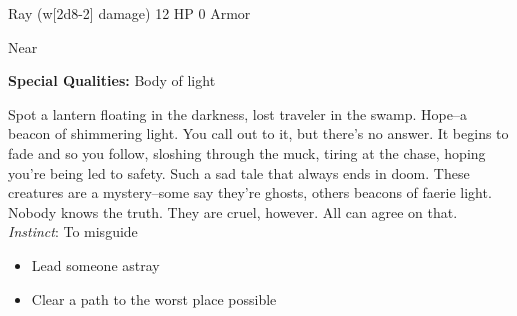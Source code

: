 \HRule
{}

Ray (w[2d8-2] damage)\hspace*{\fill} 12 HP 0 Armor

Near

\textbf{Special Qualities:}
Body of light

\HRule
Spot a lantern floating in the darkness, lost traveler in the swamp. Hope--a beacon of shimmering light. You call out to it, but there's no answer. It begins to fade and so you follow, sloshing through the muck, tiring at the chase, hoping you're being led to safety. Such a sad tale that always ends in doom. These creatures are a mystery--some say they're ghosts, others beacons of faerie light. Nobody knows the truth. They are cruel, however. All can agree on that. \emph{Instinct}: To misguide
\begin{itemize}
\item Lead someone astray
\item Clear a path to the worst place possible
\end{itemize}

